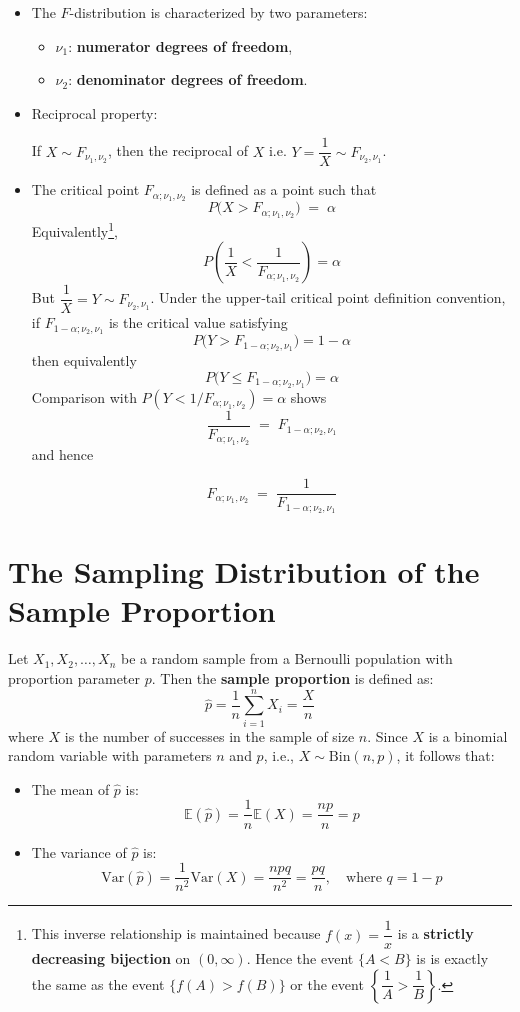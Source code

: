 \documentclass[twoside]{book}
\begin{document}
\begin{itemize}
	\item The $ F $-distribution is characterized by two parameters:
	\begin{itemize}
		\item \( \nu_1 \): \textbf{numerator degrees of freedom},
		\item \( \nu_2 \): \textbf{denominator degrees of freedom}.
	\end{itemize}

	\item Reciprocal property:
	\begin{textbox}
		If $X \sim F_{\nu_1, \nu_2}$, then the reciprocal of $X$ i.e. $Y = \dfrac{1}{X} \sim F_{\nu_2, \nu_1}$.
	\end{textbox}

	\item The critical point \(F_{\alpha; \nu_1, \nu_2}\) is defined as a point such that
	\[
	P\bigl(X > F_{\alpha; \nu_1, \nu_2}) \;=\;\alpha
	\]
	Equivalently\footnote{This inverse relationship is maintained because $f(x) = \dfrac{1}{x}$ is a \textbf{strictly decreasing bijection} on \((0,\infty)\). Hence the event \(\{A < B\}\) is is exactly the same as the event \(\{f(A) > f(B)\}\) or the event \(\left\{\dfrac{1}{A} > \dfrac{1}{B}\right\}\).},
	\[
	P\left( \dfrac1X < \dfrac1{F_{\alpha;\nu_1,\nu_2}}\right) =\alpha
	\]
	But \(\dfrac1X = Y\sim F_{\nu_2,\nu_1}\).  Under the upper‑tail critical point definition convention, if \(F_{1-\alpha;\nu_2,\nu_1}\) is the critical value satisfying
	\[
	P\bigl(Y > F_{1-\alpha;\nu_2,\nu_1}\bigr)=1-\alpha
	\]
	then equivalently
	\[
	P\bigl(Y \le F_{1-\alpha;\nu_2,\nu_1}\bigr)=\alpha
	\]
	Comparison with \(P(Y<1/F_{\alpha;\nu_1,\nu_2})=\alpha\) shows
	\[
	\frac1{F_{\alpha;\nu_1,\nu_2}}
	\;=\;
	F_{1-\alpha;\nu_2,\nu_1}
	\]
	and hence
	\begin{textbox}
		\[
		F_{\alpha;\nu_1,\nu_2}
		\;=\;
		\frac1{F_{1-\alpha;\nu_2,\nu_1}}
		\]
	\end{textbox}
\end{itemize}




\section{The Sampling Distribution of the Sample Proportion}
Let $X_1, X_2, \dots, X_n$ be a random sample from a Bernoulli population with proportion parameter $p$. Then the \textbf{sample proportion} is defined as:
\[
\hat{p} = \frac{1}{n} \sum_{i=1}^{n} X_i = \frac{X}{n}
\]
where $X$ is the number of successes in the sample of size $n$. Since \( X \) is a binomial random variable with parameters \( n \) and \( p \), i.e., \( X \sim \text{Bin}(n, p) \), it follows that:
\begin{itemize}
    \item The mean of \( \hat{p} \) is:
    \[
    \mathbb{E}\left( \hat{p}\right) = \frac{1}{n}\mathbb{E}(X) = \frac{np}{n} = p
    \]
    \item The variance of \( \hat{p} \) is:
    \[
    \text{Var}(\hat{p}) = \frac{1}{n^2}\text{Var}(X) = \frac{npq}{n^2}=\frac{pq}{n}, \quad \text{where } q = 1 - p
    \]
\end{itemize}
\end{document}
